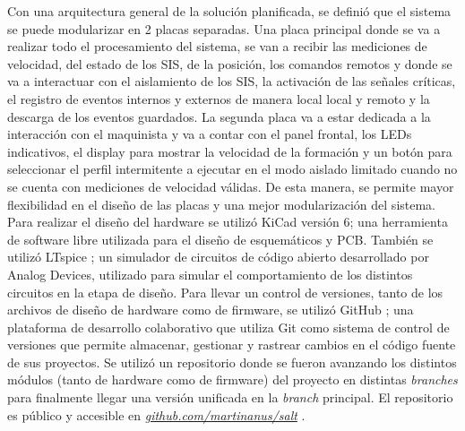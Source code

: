 Con una arquitectura general de la solución planificada, se definió que el sistema se puede modularizar en 2 placas separadas. Una placa principal donde se va a realizar todo el procesamiento del sistema, se van a recibir las mediciones de velocidad, del estado de los SIS, de la posición, los comandos remotos y donde se va a interactuar con el aislamiento de los SIS, la activación de las señales críticas, el registro de eventos internos y externos de manera local local y remoto y la descarga de los eventos guardados. La segunda placa va a estar dedicada a la interacción con el maquinista y va a contar con el panel frontal, los LEDs indicativos, el display para mostrar la velocidad de la formación y un botón para seleccionar el perfil intermitente a ejecutar en el modo aislado limitado cuando no se cuenta con mediciones de velocidad válidas. De esta manera, se permite mayor flexibilidad en el diseño de las placas y una mejor modularización del sistema. \\ 

Para realizar el diseño del hardware se utilizó KiCad \cite{kicad} versión 6; una herramienta de software libre utilizada para el diseño de esquemáticos y PCB. También se utilizó LTspice \cite{LTspice}; un simulador de circuitos de código abierto desarrollado por Analog Devices, utilizado para simular el comportamiento de los distintos circuitos en la etapa de diseño. Para llevar un control de versiones, tanto de los archivos de diseño de hardware como de firmware, se utilizó GitHub \cite{github}; una plataforma de desarrollo colaborativo que utiliza Git \cite{git} como sistema de control de versiones que permite almacenar, gestionar y rastrear cambios en el código fuente de sus proyectos. Se utilizó un repositorio donde se fueron avanzando los distintos módulos (tanto de hardware como de firmware) del proyecto en distintas \textit{branches} para finalmente llegar una versión unificada en la \textit{branch} principal. El repositorio es público y accesible en \href{https://github.com/martinanus/salt}{\textit{github.com/martinanus/salt}} \cite{repo}.







